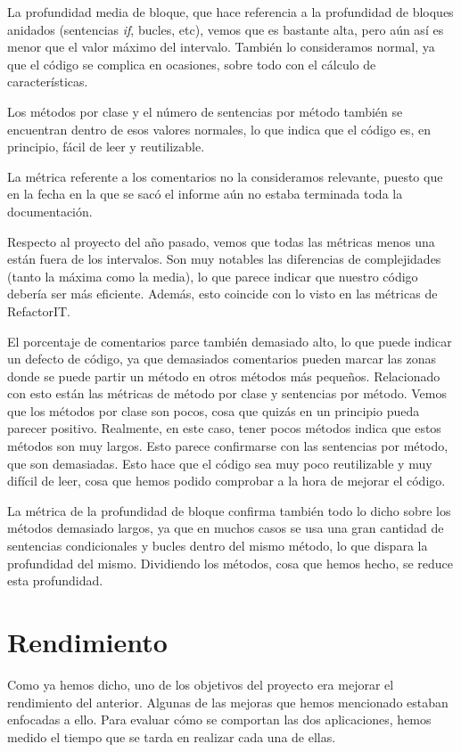 La profundidad media de bloque, que hace referencia a la profundidad de bloques anidados (sentencias \textit{if}, bucles, etc), vemos que es bastante alta, pero aún así es menor que el valor máximo del intervalo. También lo consideramos normal, ya que el código se complica en ocasiones, sobre todo con el cálculo de características.

Los métodos por clase y el número de sentencias por método también se encuentran dentro de esos valores normales, lo que indica que el código es, en principio, fácil de leer y reutilizable.

La métrica referente a los comentarios no la consideramos relevante, puesto que en la fecha en la que se sacó el informe aún no estaba terminada toda la documentación.

Respecto al proyecto del año pasado, vemos que todas las métricas menos una están fuera de los intervalos. Son muy notables las diferencias de complejidades (tanto la máxima como la media), lo que parece indicar que nuestro código debería ser más eficiente. Además, esto coincide con lo visto en las métricas de RefactorIT.

El porcentaje de comentarios parce también demasiado alto, lo que puede indicar un defecto de código, ya que demasiados comentarios pueden marcar las zonas donde se puede partir un método en otros métodos más pequeños. Relacionado con esto están las métricas de método por clase y sentencias por método. Vemos que los métodos por clase son pocos, cosa que quizás en un principio pueda parecer positivo. Realmente, en este caso, tener pocos métodos indica que estos métodos son muy largos. Esto parece confirmarse con las sentencias por método, que son demasiadas. Esto hace que el código sea muy poco reutilizable y muy difícil de leer, cosa que hemos podido comprobar a la hora de mejorar el código.

La métrica de la profundidad de bloque confirma también todo lo dicho sobre los métodos demasiado largos, ya que en muchos casos se usa una gran cantidad de sentencias condicionales y bucles dentro del mismo método, lo que dispara la profundidad del mismo. Dividiendo los métodos, cosa que hemos hecho, se reduce esta profundidad.


\section{Rendimiento}\label{rendimiento}
Como ya hemos dicho, uno de los objetivos del proyecto era mejorar el rendimiento del anterior. Algunas de las mejoras que hemos mencionado estaban enfocadas a ello. Para evaluar cómo se comportan las dos aplicaciones, hemos medido el tiempo que se tarda en realizar cada una de ellas.

